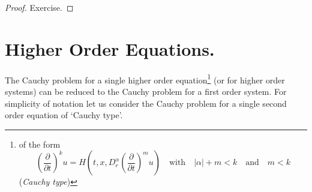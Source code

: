 \begin{proof}
Exercise.
\end{proof}

\section*{Higher Order Equations.}

The Cauchy problem for a single higher order equation\footnote[1]{of the form
$$
\left(\frac{\partial}{\partial t}\right)^{k}u=H\left(t,x,D^{\alpha}_{r}\left(\frac{\partial}{\partial t}\right)^{m}u\right)\quad\text{with}\quad |\alpha | + m< k\quad\text{and}\quad m<k
$$
({\em Cauchy type})}
(or for higher order systems) can be reduced to the Cauchy problem for a first order system. For simplicity of notation let us consider the Cauchy problem for a single second order equation of `Cauchy type'.

